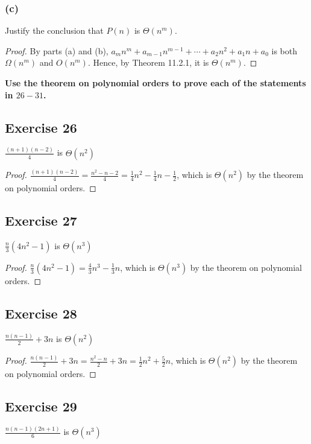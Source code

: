 \documentclass[14pt]{extarticle}
\newcommand{\dps}{\displaystyle}
\newcommand{\cy}{\color{cyan}}
\begin{document}
\subsubsection{(c)}
Justify the conclusion that \(P(n)\) is \(\Theta(n^m)\).
\begin{proof}
By parts (a) and (b), \(a_mn^m + a_{m-1}n^{m-1} + \cdots + a_2n^2 + a_1n + a_0\) is both \(\Omega(n^m)\) and \(O(n^m)\).
Hence, by Theorem 11.2.1, it is \(\Theta(n^m)\).
\end{proof}

{\bf \cy Use the theorem on polynomial orders to prove each of the statements in \(26-31\).}

\subsection{Exercise 26}
\(\dps \frac{(n+1)(n-2)}{4}\) is \(\Theta(n^2)\)

\begin{proof}
\(\dps \frac{(n+1)(n-2)}{4} = \frac{n^2-n-2}{4} = \frac{1}{4}n^2 - \frac{1}{4}n - \frac{1}{2}\), which is \(\Theta(n^2)\) 
by the theorem on polynomial orders.
\end{proof}

\subsection{Exercise 27}
\(\dps \frac{n}{3}(4n^2-1)\) is \(\Theta(n^3)\)

\begin{proof}
\(\dps \frac{n}{3}(4n^2-1) = \frac{4}{3}n^3 - \frac{1}{3}n\), which is \(\Theta(n^3)\) by the theorem on polynomial orders.
\end{proof}

\subsection{Exercise 28}
\(\dps \frac{n(n-1)}{2}+3n\) is \(\Theta(n^2)\)

\begin{proof}
\(\dps \frac{n(n-1)}{2}+3n = \frac{n^2-n}{2} + 3n = \frac{1}{2}n^2 + \frac{5}{2}n\), which is \(\Theta(n^2)\) by the 
theorem on polynomial orders.
\end{proof}

\subsection{Exercise 29}
\(\dps \frac{n(n-1)(2n+1)}{6}\) is \(\Theta(n^3)\)
\end{document}
